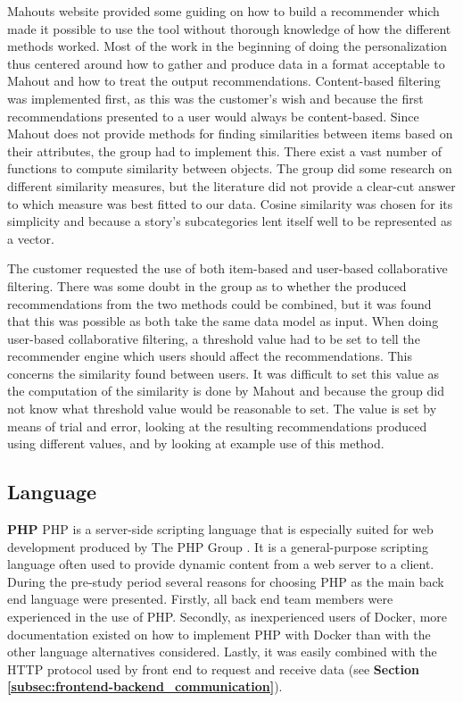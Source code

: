 Mahouts website provided some guiding on how to build a recommender which made it possible to use the tool without thorough knowledge of how the different methods worked. Most of the work in the beginning of doing the personalization thus centered around how to gather and produce data in a format acceptable to Mahout and how to treat the output recommendations. Content-based filtering was implemented first, as this was the customer's wish and because the first recommendations presented to a user would always be content-based. Since Mahout does not provide methods for finding similarities between items based on their attributes, the group had to implement this. There exist a vast number of functions to compute similarity between objects. The group did some research on different similarity measures, but the literature did not provide a clear-cut answer to which measure was best fitted to our data. Cosine similarity was chosen for its simplicity and because a story's subcategories lent itself well to be represented as a vector.\newline

The customer requested the use of both item-based and user-based collaborative filtering. There was some doubt in the group as to whether the produced recommendations from the two methods could be combined, but it was found that this was possible as both take the same data model as input. When doing user-based collaborative filtering, a threshold value had to be set to tell the recommender engine which users should affect the recommendations. This concerns the similarity found between users. It was difficult to set this value as the computation of the similarity is done by Mahout and because the group did not know what threshold value would be reasonable to set. The value is set by means of trial and error, looking at the resulting recommendations produced using different values, and by looking at example use of this method. 

\subsection{Language}
\label{subsec:backend_language}
\textbf{PHP}\newline
PHP is a server-side scripting language that is especially suited for web development produced by The PHP Group \cite{HM8}. It is a general-purpose scripting language often used to provide dynamic content from a web server to a client. During the pre-study period several reasons for choosing PHP as the main back end language were presented. Firstly, all back end team members were experienced in the use of PHP. Secondly, as inexperienced users of Docker, more documentation existed on how to implement PHP with Docker than with the other language alternatives considered.  Lastly, it was easily combined with the HTTP protocol used by front end to request and receive data (see \textbf{Section \ref{subsec:frontend-backend_communication}}).\newline

